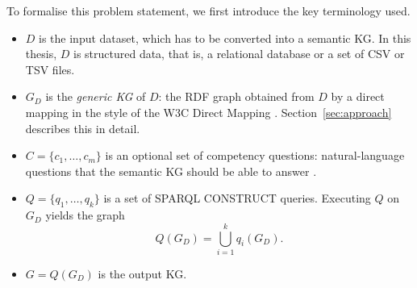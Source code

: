 To formalise this problem statement, we first introduce the key terminology used.
\begin{itemize}
  \item \(D\) is the input dataset, which has to be converted into a semantic KG\@. In this thesis, \(D\) is structured data, that is, a relational database or a set of CSV or TSV files.
  \item \(G_D\) is the \emph{generic KG} of \(D\): the RDF graph obtained from \(D\) by a direct mapping in the style of the W3C Direct Mapping \citep{w3c2012directmapping}. Section~\ref{sec:approach} describes this in detail.
  \item \(C = \{c_1, \ldots, c_m\}\) is an optional set of competency questions: natural-language questions that the semantic KG should be able to answer \citep{gruninger1995methodology}.
  \item \(Q = \{q_1, \ldots, q_k\}\) is a set of SPARQL CONSTRUCT queries. Executing \(Q\) on \(G_D\) yields the graph
  \[
    Q(G_D) = \bigcup_{i=1}^{k} q_i(G_D).
  \]
  \item \(G = Q(G_D)\) is the output KG.
\end{itemize}

